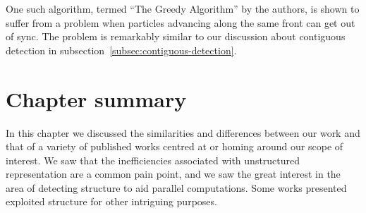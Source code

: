 One such algorithm, termed ``The Greedy Algorithm'' by the authors, is shown to suffer from a problem when particles advancing along the same front can get out of sync. The problem is remarkably similar to our discussion about contiguous detection in subsection~\ref{subsec:contiguous-detection}.









\section{Chapter summary}
In this chapter we discussed the similarities and differences between our work and that of a variety of published works centred at or homing around our scope of interest. We saw that the inefficiencies associated with unstructured representation are a common pain point, and we saw the great interest in the area of detecting structure to aid parallel computations. Some works presented exploited structure for other intriguing purposes.
